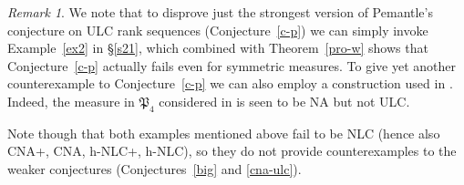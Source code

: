 \documentclass[10pt,reqno]{amsart}
\theoremstyle{plain}
\theoremstyle{definition}
\theoremstyle{remark}
\newtheorem{remark}{Remark}[section]
\newcommand{\PP}{\mathcal{P}}
\newcommand{\fP}{\mathfrak{P}}
\begin{document}
\begin{remark}\label{r-strong-NA}
We note that to disprove just the strongest version of 
Pemantle's conjecture on ULC rank sequences (Conjecture~\ref{c-p}) we can 
simply invoke Example~\ref{ex2} in \S \ref{s21}, which combined with
Theorem~\ref{pro-w} shows that
Conjecture~\ref{c-p} actually fails even for symmetric measures. To give yet 
another
counterexample to Conjecture~\ref{c-p} we can 
also employ a construction used in \cite{L2}. Indeed, the measure in  
$\fP_4$ considered in \cite[Theorem 3.5]{L2} is seen to be NA but not ULC. 

Note though that both examples mentioned 
above fail to be NLC (hence also CNA+, CNA, h-NLC+, h-NLC), so they do 
not provide counterexamples to the weaker conjectures (Conjectures~\ref{big}
and \ref{cna-ulc}). 
\end{remark}
\end{document}
